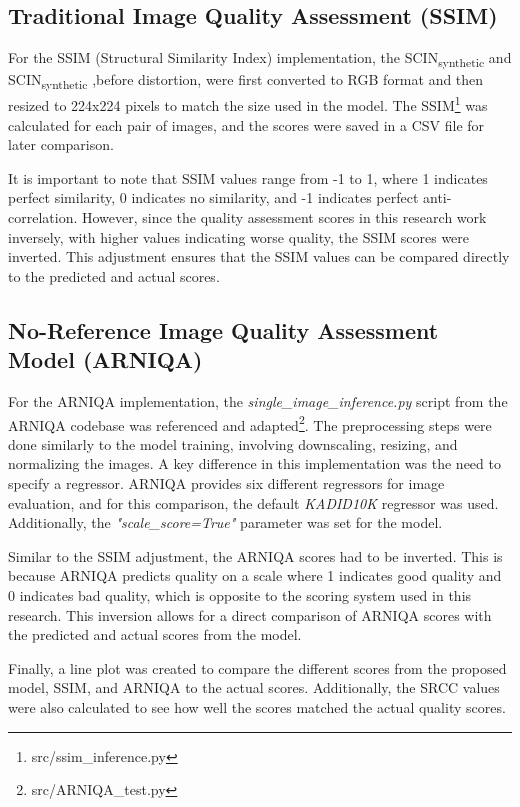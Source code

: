 \subsection{Traditional Image Quality Assessment (SSIM)}
For the SSIM (Structural Similarity Index) implementation, the SCIN\textsubscript{synthetic} and SCIN\textsubscript{synthetic} ,before distortion, were first converted to RGB format and then resized to 224x224 pixels to match the size used in the model. The SSIM\footnote{src/ssim\_inference.py} was calculated for each pair of images, and the scores were saved in a CSV file for later comparison. \par
\vspace{\baselineskip}
\noindent
It is important to note that SSIM values range from -1 to 1, where 1 indicates perfect similarity, 0 indicates no similarity, and -1 indicates perfect anti-correlation. However, since the quality assessment scores in this research work inversely, with higher values indicating worse quality, the SSIM scores were inverted. This adjustment ensures that the SSIM values can be compared directly to the predicted and actual scores. \par


\subsection{No-Reference  Image Quality Assessment Model (ARNIQA)}
For the ARNIQA\autocite{ARNIQA} implementation, the \textit{single\_image\_inference.py} script from the ARNIQA codebase was referenced and adapted\footnote{src/ARNIQA\_test.py}. The preprocessing steps were done similarly to the model training, involving downscaling, resizing, and normalizing the images. A key difference in this implementation was the need to specify a regressor. ARNIQA provides six different regressors for image evaluation, and for this comparison, the default \textit{KADID10K} regressor was used. Additionally, the \textit{"scale\_score=True"} parameter was set for the model. \par
\vspace{\baselineskip}
\noindent
Similar to the SSIM adjustment, the ARNIQA scores had to be inverted. This is because ARNIQA predicts quality on a scale where 1 indicates good quality and 0 indicates bad quality, which is opposite to the scoring system used in this research. This inversion allows for a direct comparison of ARNIQA scores with the predicted and actual scores from the model. \par
\vspace{\baselineskip}
\noindent
Finally, a line plot was created to compare the different scores from the proposed model, SSIM, and ARNIQA to the actual scores. Additionally, the SRCC values were also calculated to see how well the scores matched the actual quality scores. \par

